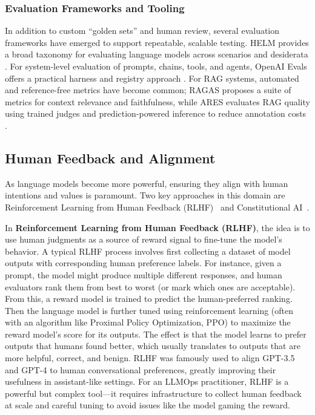 \subsubsection{Evaluation Frameworks and Tooling}
In addition to custom ``golden sets'' and human review, several evaluation frameworks have emerged to support
repeatable, scalable testing. HELM provides a broad taxonomy for evaluating language models across scenarios and
desiderata \cite{helm}. For system-level evaluation of prompts, chains, tools, and agents, OpenAI Evals offers a
practical harness and registry approach \cite{openai_evals}. For RAG systems, automated and reference-free metrics have
become common; RAGAS proposes a suite of metrics for context relevance and faithfulness, while ARES evaluates RAG quality
using trained judges and prediction-powered inference to reduce annotation costs \cite{ragas_eacl2024,ares}.

\subsection{Human Feedback and Alignment}
As language models become more powerful, ensuring they align with human intentions and values is paramount. Two key approaches in this domain are Reinforcement Learning from Human Feedback (RLHF)~\cite{ouyang2022instructgpt} and Constitutional AI~\cite{bai2022constitutional}.

In \textbf{Reinforcement Learning from Human Feedback (RLHF)}, the idea is to use human judgments as a source of reward signal to fine-tune the model’s behavior. A typical RLHF process involves first collecting a dataset of model outputs with corresponding human preference labels. For instance, given a prompt, the model might produce multiple different responses, and human evaluators rank them from best to worst (or mark which ones are acceptable). From this, a reward model is trained to predict the human-preferred ranking. Then the language model is further tuned using reinforcement learning (often with an algorithm like Proximal Policy Optimization, PPO) to maximize the reward model’s score for its outputs. The effect is that the model learns to prefer outputs that humans found better, which usually translates to outputs that are more helpful, correct, and benign. RLHF was famously used to align GPT-3.5 and GPT-4 to human conversational preferences, greatly improving their usefulness in assistant-like settings. For an LLMOps practitioner, RLHF is a powerful but complex tool—it requires infrastructure to collect human feedback at scale and careful tuning to avoid issues like the model gaming the reward. 

